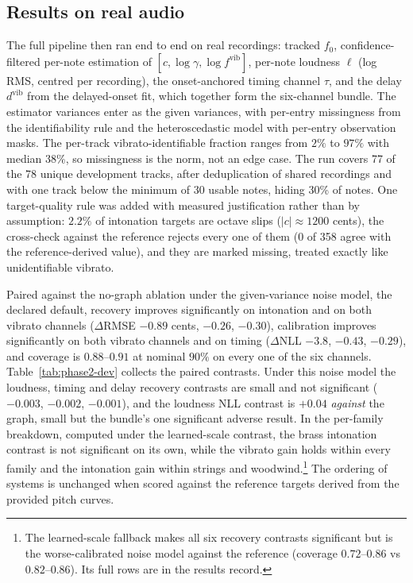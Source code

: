 \subsection{Results on real audio}
\label{sec:phase2-real}
The full pipeline then ran end to end on real recordings: tracked $f_0$,
confidence-filtered per-note estimation of $[c, \log\gamma, \log
f^{\mathrm{vib}}]$, per-note loudness $\ell$ (log RMS, centred per
recording), the onset-anchored timing channel $\tau$, and the delay
$d^{\mathrm{vib}}$ from the delayed-onset fit, which together form the
six-channel bundle. The estimator variances enter as the given variances,
with per-entry missingness from the identifiability rule and the
heteroscedastic model with per-entry observation masks. The per-track
vibrato-identifiable fraction ranges from $2\%$ to $97\%$ with median
$38\%$, so missingness is the norm, not an edge case. The run covers 77
of the 78 unique development tracks, after deduplication of shared
recordings and with one track below the minimum of 30 usable notes,
hiding 30\% of notes. One target-quality rule was added with measured
justification rather than by assumption: $2.2\%$ of intonation targets
are octave slips ($|c| \approx 1200$ cents), the cross-check against the
reference rejects every one of them (0 of 358 agree with the
reference-derived value), and they are marked missing, treated exactly
like unidentifiable vibrato.

Paired against the no-graph ablation under the given-variance noise
model, the declared default, recovery improves significantly on
intonation and on both vibrato channels ($\Delta$RMSE $-0.89$ cents,
$-0.26$, $-0.30$), calibration improves significantly on both vibrato
channels and on timing ($\Delta$NLL $-3.8$, $-0.43$, $-0.29$), and
coverage is $0.88$--$0.91$ at nominal $90\%$ on every one of the six
channels. Table~\ref{tab:phase2-dev} collects the paired contrasts. Under
this noise model the loudness, timing and delay recovery contrasts are
small and not significant ($-0.003$, $-0.002$, $-0.001$), and the
loudness NLL contrast is $+0.04$ \emph{against} the graph, small but the
bundle's one significant adverse result. In the per-family breakdown,
computed under the learned-scale contrast, the brass intonation contrast
is not significant on its own, while the vibrato gain holds within every
family and the intonation gain within strings and
woodwind.\footnote{The learned-scale fallback makes all six recovery
contrasts significant but is the worse-calibrated noise model against the
reference (coverage $0.72$--$0.86$ vs $0.82$--$0.86$). Its full rows are
in the results record.} The ordering of systems is unchanged when scored
against the reference targets derived from the provided pitch curves.

